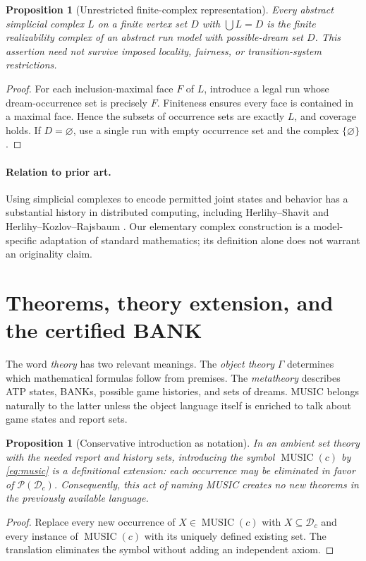 \documentclass[11pt,letterpaper]{article}
\newtheorem{proposition}[theorem]{Proposition}
\theoremstyle{definition}
\theoremstyle{remark}
\newcommand{\PSet}{\mathcal{P}}
\newcommand{\Dream}{\mathcal{D}}
\newcommand{\Music}{\operatorname{MUSIC}}
\begin{document}
\begin{proposition}[Unrestricted finite-complex representation]\label{prop:finite-realization}
Every abstract simplicial complex $L$ on a finite vertex set $D$ with
$\bigcup L=D$ is the finite realizability complex of an abstract run model
with possible-dream set $D$. This assertion need not survive imposed locality,
fairness, or transition-system restrictions.
\end{proposition}
\begin{proof}
For each inclusion-maximal face $F$ of $L$, introduce a legal run whose
dream-occurrence set is precisely $F$. Finiteness ensures every face is
contained in a maximal face. Hence the subsets of occurrence sets are exactly
$L$, and coverage holds. If $D=\varnothing$, use a single run with empty
occurrence set and the complex $\{\varnothing\}$.
\end{proof}

\paragraph{Relation to prior art.} Using simplicial complexes to encode permitted joint states and behavior has a substantial history in distributed computing, including Herlihy--Shavit \cite{herlihy-shavit} and Herlihy--Kozlov--Rajsbaum \cite{herlihy-kozlov}. Our elementary complex construction is a model-specific adaptation of standard mathematics; its definition alone does not warrant an originality claim.

\section{Theorems, theory extension, and the certified BANK}
The word \emph{theory} has two relevant meanings. The \emph{object theory} $\Gamma$ determines which mathematical formulas follow from premises. The \emph{metatheory} describes ATP states, BANKs, possible game histories, and sets of dreams. MUSIC belongs naturally to the latter unless the object language itself is enriched to talk about game states and report sets.

\begin{proposition}[Conservative introduction as notation]\label{prop:defextend}
In an ambient set theory with the needed report and history sets, introducing the symbol $\Music(c)$ by \eqref{eq:music} is a definitional extension: each occurrence may be eliminated in favor of $\PSet(\Dream_c)$. Consequently, this act of naming MUSIC creates no new theorems in the previously available language.
\end{proposition}
\begin{proof}
Replace every new occurrence of $X\in\Music(c)$ with $X\subseteq\Dream_c$ and every instance of $\Music(c)$ with its uniquely defined existing set. The translation eliminates the symbol without adding an independent axiom.
\end{proof}
\end{document}
